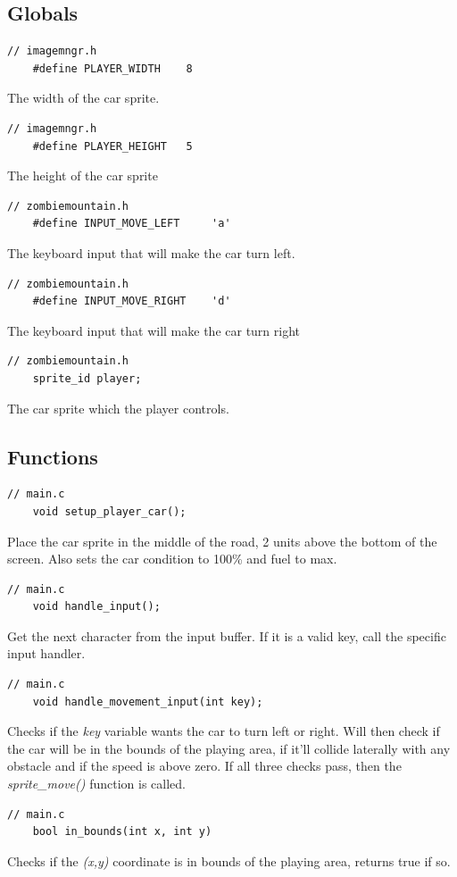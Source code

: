 \documentclass{article}
\begin{document}
\subsection*{Globals}
\begin{lstlisting}[style=CStyle]
	// imagemngr.h
	#define PLAYER_WIDTH	8
\end{lstlisting}
The width of the car sprite.
\begin{lstlisting}[style=CStyle]
	// imagemngr.h
	#define PLAYER_HEIGHT	5
\end{lstlisting}
The height of the car sprite
\begin{lstlisting}[style=CStyle]
	// zombiemountain.h
	#define INPUT_MOVE_LEFT		'a'
\end{lstlisting}
The keyboard input that will make the car turn left.
\begin{lstlisting}[style=CStyle]
	// zombiemountain.h
	#define INPUT_MOVE_RIGHT	'd'
\end{lstlisting}
The keyboard input that will make the car turn right
\begin{lstlisting}[style=CStyle]
	// zombiemountain.h
	sprite_id player;
\end{lstlisting}
The car sprite which the player controls.
\newline

\subsection*{Functions}
\begin{lstlisting}[style=CStyle]
	// main.c
	void setup_player_car();
\end{lstlisting}
Place the car sprite in the middle of the road, 2 units above the bottom of the screen. Also sets the car condition to 100\% and fuel to max.
\begin{lstlisting}[style=CStyle]
	// main.c
	void handle_input();
\end{lstlisting}
Get the next character from the input buffer. If it is a valid key, call the specific input handler. 
\begin{lstlisting}[style=CStyle]
	// main.c
	void handle_movement_input(int key);
\end{lstlisting}
Checks if the \emph{key} variable wants the car to turn left or right. Will then check if the car will be in the bounds of the playing area, if it'll collide laterally with any obstacle and if the speed is above zero. If all three checks pass, then the \emph{sprite\_move()} function is called.
\begin{lstlisting}[style=CStyle]
	// main.c
	bool in_bounds(int x, int y)
\end{lstlisting}
Checks if the \emph{(x,y)} coordinate is in bounds of the playing area, returns true if so.
\newline
\newpage
\end{document}

